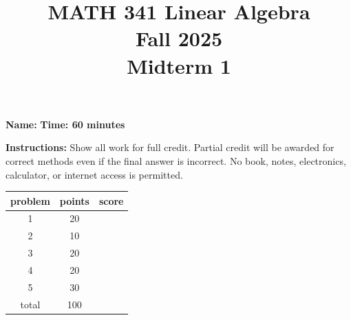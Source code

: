 \documentclass[11pt]{amsart}
\title{MATH 341 Linear Algebra\\ Fall 2025\\ Midterm 1}
\author{}
\date{}
\begin{document}
\maketitle

\noindent\textbf{Name:} \underline{\hspace{3in}} \hfill \textbf{Time: 60 minutes}

\vspace{0.2in}

\noindent\textbf{Instructions:} Show all work for full credit. Partial credit will be awarded for correct methods even if the final answer is incorrect. No book, notes, electronics, calculator, or internet access is permitted.
\vfill

\begin{center}
{\Large{
\begin{tabular}{ccc}
problem&points&score\\
\hline
1&20&\\ \hline
2&10&\\ \hline
3&20&\\ \hline
4&20&\\ \hline
5&30&\\ \hline
\hline 
total&100&\\
\end{tabular}
}}
\end{center}
\vfill
\vfill
\newpage
\end{document}
